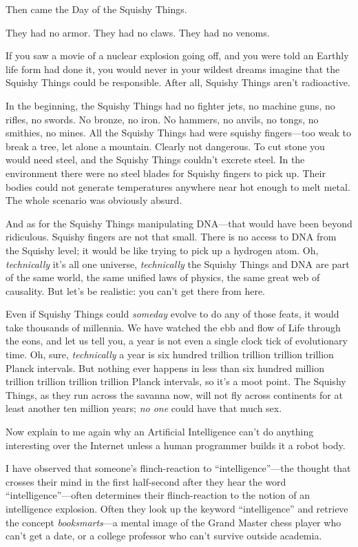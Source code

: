 {
 Then came the Day of the Squishy Things.}

{
 They had no armor. They had no claws. They had no venoms.}

{
 If you saw a movie of a nuclear explosion going off, and you were
told an Earthly life form had done it, you would never in your wildest
dreams imagine that the Squishy Things could be responsible. After all,
Squishy Things aren't radioactive.}

{
 In the beginning, the Squishy Things had no fighter jets, no
machine guns, no rifles, no swords. No bronze, no iron. No hammers, no
anvils, no tongs, no smithies, no mines. All the Squishy Things had
were squishy fingers---too weak to break a tree, let alone a mountain.
Clearly not dangerous. To cut stone you would need steel, and the
Squishy Things couldn't excrete steel. In the
environment there were no steel blades for Squishy fingers to pick up.
Their bodies could not generate temperatures anywhere near hot enough
to melt metal. The whole scenario was obviously absurd.}

{
 And as for the Squishy Things manipulating DNA---that would have
been beyond ridiculous. Squishy fingers are not that small. There is no
access to DNA from the Squishy level; it would be like trying to pick
up a hydrogen atom. Oh, \textit{technically} it's all
one universe, \textit{technically} the Squishy Things and DNA are part
of the same world, the same unified laws of physics, the same great web
of causality. But let's be realistic: you
can't get there from here.}

{
 Even if Squishy Things could \textit{someday} evolve to do any of
those feats, it would take thousands of millennia. We have watched the
ebb and flow of Life through the eons, and let us tell you, a year is
not even a single clock tick of evolutionary time. Oh, sure,
\textit{technically} a year is six hundred trillion trillion trillion
trillion Planck intervals. But nothing ever happens in less than six
hundred million trillion trillion trillion trillion Planck intervals,
so it's a moot point. The Squishy Things, as they run
across the savanna now, will not fly across continents for at least
another ten million years; \textit{no one} could have that much sex.}

{
 Now explain to me again why an Artificial Intelligence
can't do anything interesting over the Internet unless
a human programmer builds it a robot body.}

{
 I have observed that someone's flinch-reaction to
``intelligence''---the thought that
crosses their mind in the first half-second after they hear the word
``intelligence''---often determines
their flinch-reaction to the notion of an intelligence explosion. Often
they look up the keyword
``intelligence'' and retrieve the
concept \textit{booksmarts}{}---a mental image of the Grand Master
chess player who can't get a date, or a college
professor who can't survive outside academia.}

